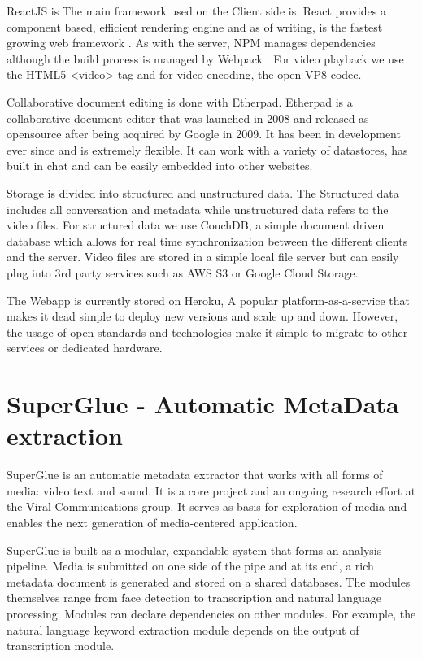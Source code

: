 ReactJS is The main framework used on the Client side is. React provides a component based, efficient rendering engine and as of writing, is the fastest growing web framework \cite{reactjs}. As with the server, NPM manages dependencies although the build process is managed by Webpack \cite{webpack}. For video playback we use the HTML5 <video> tag and for video encoding, the open VP8\cite{vp8} codec. 

Collaborative document editing is done with Etherpad\cite{etherpad}. Etherpad is a collaborative document editor that was launched in 2008 and released as opensource after being acquired by Google in 2009. It has been in development ever since and is extremely flexible. It can work with a variety of datastores, has built in chat and can be easily embedded into other websites.

Storage is divided into structured and unstructured data. The Structured data includes all conversation and metadata while unstructured data refers to the video files. For structured data we use CouchDB\cite{couchdb}, a simple document driven database which allows for real time synchronization between the different clients and the server.  Video files are stored in a simple local file server but can easily plug into 3rd party services such as AWS S3 or Google Cloud Storage.

The Webapp is currently stored on Heroku, A popular platform-as-a-service that makes it dead simple to deploy new versions and scale up and down. However, the usage of open standards and technologies make it simple to migrate to other services or dedicated hardware. 

\section{SuperGlue - Automatic MetaData extraction}
SuperGlue is an automatic metadata extractor that works with all forms of media: video text and sound. It is a core project and an ongoing research effort at the Viral Communications group. It serves as basis for exploration of media and enables the next generation of media-centered application.

SuperGlue is built as a modular, expandable system that forms an analysis pipeline. Media is submitted on one side of the pipe and at its end, a rich metadata document is generated and stored on a shared databases. The modules themselves range from face detection to transcription and natural language processing. Modules can declare dependencies on other modules. For example, the natural language keyword extraction module depends on the output of transcription module.

